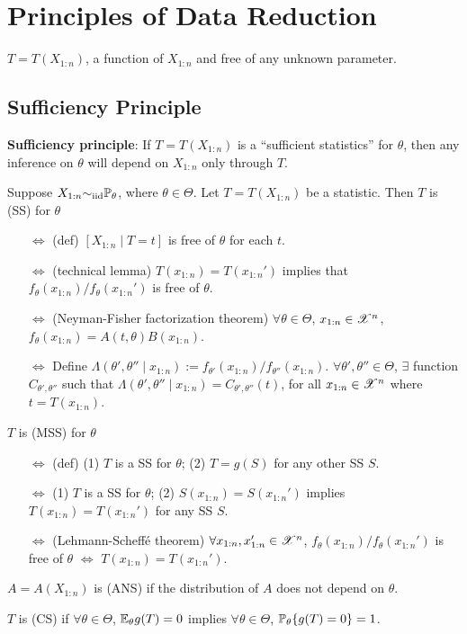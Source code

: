 \documentclass[10pt,a4paper]{book}
\begin{document}
\section{Principles of Data Reduction}\label{sec:prin-data-reduce}
 $T=T(X_{1:n})$, a function of $X_{1:n}$ and free of any unknown parameter.  

\subsection{Sufficiency Principle}\label{sec:prin-data-reduce-suff}
\textbf{Sufficiency principle}: If $T=T(X_{1:n})$ is a ``sufficient statistics'' for $\theta$, then any inference on $\theta$ will depend on $X_{1:n}$ only through $T$.

\begin{defbox}
	\begin{definition}\label{def:stat-SS-MSS-ANS-CS}
		Suppose $X_{1:n}{\sim}_{\mathrm{iid}} \mathbb P_{\theta}$, where $\theta\in\Theta$. Let $T=T(X_{1:n})$ be a statistic. Then $T$ is  (SS) for $\theta$
		\begin{itemize}
			\item[$\Leftrightarrow$] (def) $[X_{1:n}\mid T=t]$ is free of $\theta$ for each $t$.
			\item[$\Leftrightarrow$] (technical lemma) $T(x_{1:n})=T(x_{1:n}')$ implies that $f_{\theta}(x_{1:n})/f_{\theta}(x_{1:n}')$ is free of $\theta$.
			\item[$\Leftrightarrow$] (Neyman-Fisher factorization theorem) $\forall\theta\in\Theta$, $x_{1:n}\in\mathscr{X}^n$, $f_\theta(x_{1:n})=A(t,\theta)B(x_{1:n})$.
		\item[$\Leftrightarrow$] Define $\Lambda(\theta',\theta''\mid x_{1:n}):=f_{\theta'}(x_{1:n})/f_{\theta''}(x_{1:n})$. $\forall \theta',\theta''\in\Theta$, $\exists$ function $C_{\theta',\theta''}$ such that $\Lambda(\theta',\theta''\mid x_{1:n})=C_{\theta',\theta''}(t)$, for all $x_{1:n}\in\mathscr{X}^n$ where $t=T(x_{1:n})$.    
		\end{itemize}
	$T$ is  (MSS) for $\theta$
	\begin{itemize}
		\item[$\Leftrightarrow$] (def) (1) $T$ is a SS for $\theta$; (2) $T=g(S)$ for any other SS $S$.
		\item[$\Leftrightarrow$] (1) $T$ is a SS for $\theta$; (2) $S(x_{1:n})=S(x_{1:n}')$ implies $T(x_{1:n})=T(x_{1:n}')$ for any SS $S$.   
		\item[$\Leftrightarrow$] (Lehmann-Scheffé theorem) $\forall x_{1:n},x_{1:n}'\in\mathscr{X}^n$, $f_{\theta}(x_{1:n})/f_{\theta}(x_{1:n}')$ is free of $\theta$ $\Leftrightarrow$ $T(x_{1:n})=T(x_{1:n}')$.    
	\end{itemize}
	$A=A(X_{1:n})$ is  (ANS) if the distribution of $A$ does not depend on $\theta$. 

	\noindent $T$ is  (CS) if $\forall\theta\in\Theta$, $\mathbb E_{\theta}g(T)=0$ implies $\forall\theta\in\Theta$, $\mathbb P_{\theta}\{g(T)=0\}=1$. 
	\end{definition}
\end{defbox}
\end{document}
